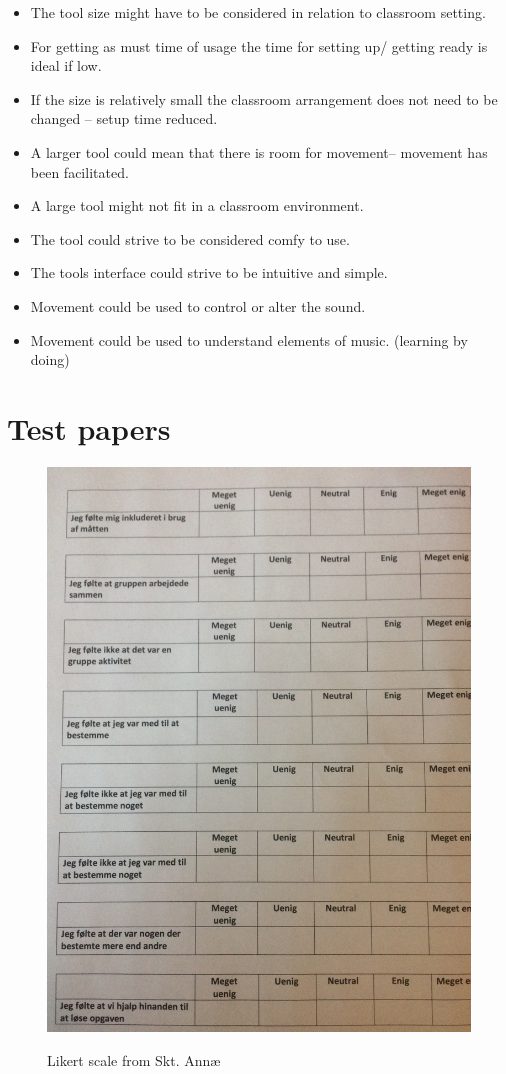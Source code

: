 \begin{itemize}
\item	The tool size might have to be considered in relation to classroom setting. 
\item	For getting as must time of usage the time for setting up/ getting ready is ideal if low. 
\item	If the size is relatively small the classroom arrangement does not need to be changed – setup time reduced. 
\item	A larger tool could mean that there is room for movement– movement has been facilitated. 
\item	A large tool might not fit in a classroom environment.
\item	The tool could strive to be considered comfy to use.   
\item	The tools interface could strive to be intuitive and simple.
\item	Movement could be used to control or alter the sound. 
\item	Movement could be used to understand elements of music. (learning by doing) 
\end{itemize}

\section{Test papers}
\begin{figure}[H]
	\centering
	\includegraphics[width=0.7\linewidth]{figure/Appendices/likerts}
	\label{fig:likertScale}
	\caption{Likert scale from Skt. Annæ}
\end{figure}

